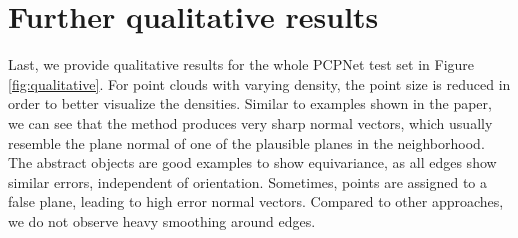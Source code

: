 \documentclass[10pt,twocolumn,letterpaper]{article}
\begin{document}
\section{Further qualitative results}
\label{sec:qualitative}
\vspace{-0.1cm}
Last, we provide qualitative results for the whole PCPNet test set in Figure \ref{fig:qualitative}. For point clouds with varying density, the point size is reduced in order to better visualize the densities. Similar to examples shown in the paper, we can see that the method produces very sharp normal vectors, which usually resemble the plane normal of one of the plausible planes in the neighborhood. The abstract objects are good examples to show equivariance, as all edges show similar errors, independent of orientation. Sometimes, points are assigned to a false plane, leading to high error normal vectors. Compared to other approaches, we do not observe heavy smoothing around edges.
\end{document}
